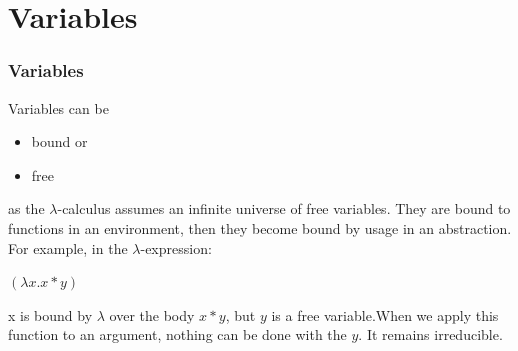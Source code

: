 \documentclass{beamer}
\begin{document}
\section{Variables}
\begin{frame} [fragile, label = test]
    \frametitle{Variables}
     
    Variables can be 
    \begin{itemize}
        \item bound or 
        \item free 
    \end{itemize}

        as the $\lambda$-calculus assumes an infinite universe of free
    variables. They are bound to functions in an environment, then they become bound by usage in an abstraction. \\
    \pause
    For example, in the $\lambda$-expression:
    \begin{center}
    $(\lambda x. x*y)$
    \end{center}
    \pause
    x is bound by $\lambda$ over the body $x*y$, but $y$ is a free variable.When we apply this function to an argument, nothing can be done with the $y$. It remains irreducible.
    \end{frame}
\end{document}

